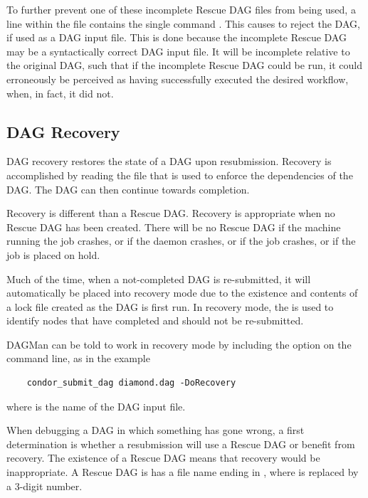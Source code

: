 To further prevent one of these incomplete Rescue DAG files from being used,
a line within the file contains the single command .
This causes  to reject the DAG, if used as a DAG input file.
This is done because the
incomplete Rescue DAG may be a syntactically correct DAG input file.
It will be incomplete relative to the original DAG,
such that if the incomplete Rescue DAG could be run,
it could erroneously be perceived as
having successfully executed the desired workflow, when, in fact,
it did not.

\subsection{\label{sec:DAGMan-recovery}DAG Recovery}

DAG recovery restores the state of a DAG upon resubmission.
Recovery is accomplished by reading the 
file that is used to enforce the dependencies of the DAG.
The DAG can then continue towards completion.

Recovery is different than a Rescue DAG.
Recovery is appropriate when no Rescue DAG has been created.
There will be no Rescue DAG 
if the machine running the  job crashes,
or if the  daemon crashes,
or if the  job crashes,
or if the  job is placed on hold.

Much of the time, when a not-completed DAG is re-submitted,
it will automatically be placed into recovery mode
due to the existence and contents of a lock file created as the DAG
is first run.
In recovery mode, the  is used to identify
nodes that have completed and should not be re-submitted.

DAGMan can be told to work in recovery mode by including the
 option on the command line, as in the example
\begin{verbatim}
    condor_submit_dag diamond.dag -DoRecovery
\end{verbatim}
where  is the name of the DAG input file.

When debugging a DAG in which something has gone wrong,
a first determination is whether a resubmission will
use a Rescue DAG or benefit from recovery.
The existence of a Rescue DAG means that recovery would be inappropriate.
A Rescue DAG is has a file name ending in ,
where  is replaced by a 3-digit number.

